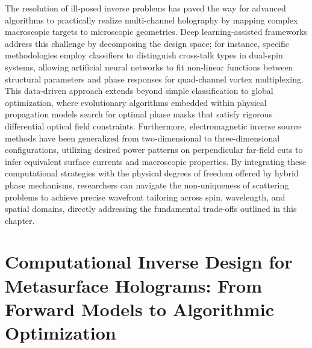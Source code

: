 \documentclass[11pt]{article}
\begin{document}
The resolution of ill-posed inverse problems has paved the way for advanced algorithms to practically realize multi-channel holography by mapping complex macroscopic targets to microscopic geometries. Deep learning-assisted frameworks address this challenge by decomposing the design space; for instance, specific methodologies employ classifiers to distinguish cross-talk types in dual-spin systems, allowing artificial neural networks to fit non-linear functions between structural parameters and phase responses for quad-channel vortex multiplexing. This data-driven approach extends beyond simple classification to global optimization, where evolutionary algorithms embedded within physical propagation models search for optimal phase masks that satisfy rigorous differential optical field constraints. Furthermore, electromagnetic inverse source methods have been generalized from two-dimensional to three-dimensional configurations, utilizing desired power patterns on perpendicular far-field cuts to infer equivalent surface currents and macroscopic properties. By integrating these computational strategies with the physical degrees of freedom offered by hybrid phase mechanisms, researchers can navigate the non-uniqueness of scattering problems to achieve precise wavefront tailoring across spin, wavelength, and spatial domains, directly addressing the fundamental trade-offs outlined in this chapter. \citep{doi_10_1117_1_apn_2_1_016010_57069347} \citep{doi_10_1117_12_3110717_26d5b63b} \citep{doi_10_1109_lawp_2023_3266337_3b44a88a}

\section{Computational Inverse Design for Metasurface Holograms: From Forward Models to Algorithmic Optimization}\label{computational-inverse-design-for-metasurface-holograms-from-forward-models-to-algorithmic-optimization}
\end{document}
